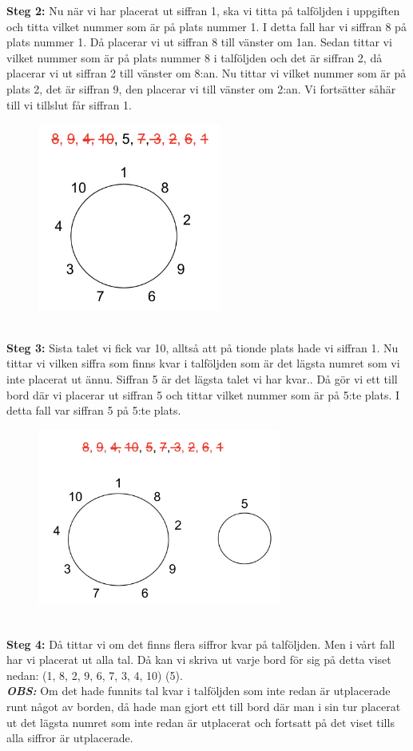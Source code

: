 \documentclass[nobib]{tufte-handout}
\begin{document}
\begin{xca2}
 \textbf{Steg 2:} Nu när vi har placerat ut siffran 1, ska vi titta på talföljden i uppgiften och titta vilket nummer som är på plats nummer 1. I detta fall har vi siffran 8 på plats nummer 1. Då placerar vi ut siffran 8 till vänster om 1an.  Sedan tittar vi vilket nummer som är på plats nummer 8 i talföljden och det är siffran 2, då placerar vi ut siffran 2 till vänster om 8:an. Nu tittar vi vilket nummer som är på plats 2, det är siffran 9, den placerar vi till vänster om 2:an. Vi fortsätter såhär till vi tillslut får siffran 1.
 \\
  \begin{figure}[h]
\includegraphics[width=60mm]{ovning_6.2.png}
\end{figure}
\\
 \textbf{Steg 3:} Sista talet vi fick var 10, alltså att på tionde plats hade vi siffran 1. Nu tittar vi vilken siffra som finns kvar i talföljden som är det lägsta numret som vi inte placerat ut ännu. Siffran 5 är det lägsta talet vi har kvar.. Då gör vi ett till bord där vi placerar ut siffran 5 och tittar vilket nummer som är på 5:te plats. I detta fall var siffran 5 på 5:te plats.
 \\
  \begin{figure}[h]
\includegraphics[width=80mm]{ovning_6.3.png}
\end{figure}
\\
 \textbf{Steg 4:} Då tittar vi om det finns flera siffror kvar på talföljden. Men i vårt fall har vi placerat ut alla tal. Då kan vi skriva ut varje bord för sig på detta viset nedan:
(1, 8, 2, 9, 6, 7, 3, 4, 10) (5).
\\ \bigskip
 \textbf{\textit{OBS:}} Om det hade funnits tal kvar i talföljden som inte redan är utplacerade runt något av borden, då hade man gjort ett till bord där man i sin tur placerat ut det lägsta numret som inte redan är utplacerat och fortsatt på det viset tills alla siffror är utplacerade.



\end{xca2}
%
%
\end{document}
